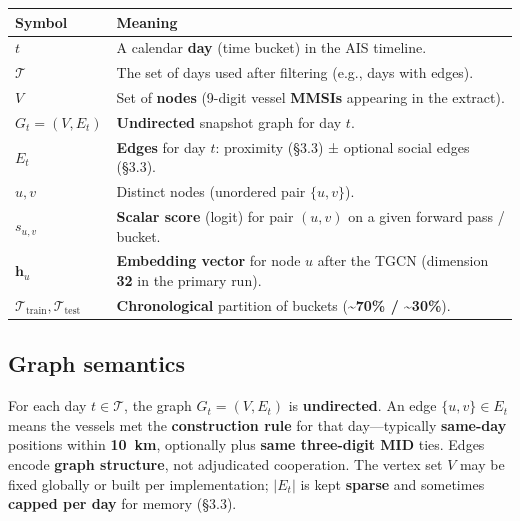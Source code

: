 \documentclass[
]{article}
\newcounter{none} %
\begin{document}
{\def\LTcaptype{none} %
\begin{longtable}[]{@{}
  >{\raggedright\arraybackslash}p{}
  >{\raggedright\arraybackslash}p{}@{}}
\toprule\noalign{}
\begin{minipage}[b]{\linewidth}\raggedright
Symbol
\end{minipage} & \begin{minipage}[b]{\linewidth}\raggedright
Meaning
\end{minipage} \\
\midrule\noalign{}
\endhead
\bottomrule\noalign{}
\endlastfoot
\(t\) & A calendar \textbf{day} (time bucket) in the AIS timeline. \\
\(\mathcal{T}\) & The set of days used after filtering (e.g., days with
edges). \\
\(V\) & Set of \textbf{nodes} (9-digit vessel \textbf{MMSIs} appearing
in the extract). \\
\(G_t = (V, E_t)\) & \textbf{Undirected} snapshot graph for day
\(t\). \\
\(E_t\) & \textbf{Edges} for day \(t\): proximity (§3.3) ± optional
social edges (§3.3). \\
\(u, v\) & Distinct nodes (unordered pair \(\{u,v\}\)). \\
\(s_{u,v}\) & \textbf{Scalar score} (logit) for pair \((u,v)\) on a
given forward pass / bucket. \\
\(\mathbf{h}_u\) & \textbf{Embedding vector} for node \(u\) after the
TGCN (dimension \textbf{32} in the primary run). \\
\(\mathcal{T}_{\mathrm{train}}, \mathcal{T}_{\mathrm{test}}\) &
\textbf{Chronological} partition of buckets (\textbf{\textasciitilde70\%
/ \textasciitilde30\%}). \\
\end{longtable}
}

\subsection*{Graph semantics}\label{graph-semantics}

For each day \(t \in \mathcal{T}\), the graph \(G_t = (V, E_t)\) is
\textbf{undirected}. An edge \(\{u,v\} \in E_t\) means the vessels met
the \textbf{construction rule} for that day---typically
\textbf{same-day} positions within \textbf{10~km}, optionally plus
\textbf{same three-digit MID} ties. Edges encode \textbf{graph
structure}, not adjudicated cooperation. The vertex set \(V\) may be
fixed globally or built per implementation; \(|E_t|\) is kept
\textbf{sparse} and sometimes \textbf{capped per day} for memory (§3.3).
\end{document}
